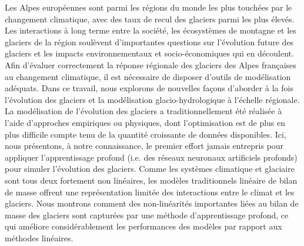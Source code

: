 Les Alpes européennes sont parmi les régions du monde les plus touchées par le changement climatique, avec des taux de recul des glaciers parmi les plus élevés. Les interactions à long terme entre la société, les écosystèmes de montagne et les glaciers de la région soulèvent d'importantes questions sur l'évolution future des glaciers et les impacts environnementaux et socio-économiques qui en découlent. Afin d'évaluer correctement la réponse régionale des glaciers des Alpes françaises au changement climatique, il est nécessaire de disposer d'outils de modélisation adéquats. Dans ce travail, nous explorons de nouvelles façons d'aborder à la fois l'évolution des glaciers et la modélisation glacio-hydrologique à l'échelle régionale. La modélisation de l'évolution des glaciers a traditionnellement été réalisée à l'aide d'approches empiriques ou physiques, dont l'optimisation est de plus en plus difficile compte tenu de la quantité croissante de données disponibles. Ici, nous présentons, à notre connaissance, le premier effort jamais entrepris pour appliquer l'apprentissage profond (i.e. des réseaux neuronaux artificiels profonds) pour simuler l'évolution des glaciers. Comme les systèmes climatique et glaciaire sont tous deux fortement non linéaires, les modèles traditionnels linéaire de bilan de masse offrent une représentation limitée des interactions entre le climat et les glaciers. Nous montrons comment des non-linéarités importantes liées au bilan de masse des glaciers sont capturées par une méthode d'apprentissage profond, ce qui améliore considérablement les performances des modèles par rapport aux méthodes linéaires. 

